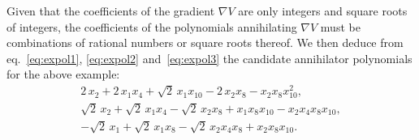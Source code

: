 \documentclass[11pt,a4paper]{article}
\begin{document}
	Given that the coefficients of the gradient $\nabla V$ are only integers and square roots of integers, the coefficients of the polynomials annihilating $\nabla V$ must be combinations of rational numbers or square roots thereof. We then deduce from eq.~\eqref{eq:expol1}, \eqref{eq:expol2} and~\eqref{eq:expol3} the candidate annihilator polynomials for the above example:
	\begin{equation}
		\begin{gathered}
			2\,x_{2} + 2\,x_{1}x_{4} + \sqrt{2}\,x_{1}x_{10} - 2\,x_{2}x_{8} - x_{2}x_{8}x_{10}^{2},\\
	      \sqrt{2}\,x_{2} + \sqrt{2}\,x_{1}x_{4} - \sqrt{2}\,x_{2}x_{8} + x_{1}x_{8}x_{10} - x_{2}x_{4}x_{8}x_{10}, \\
	      -\sqrt{2}\,x_{1} + \sqrt{2}\,x_{1}x_{8} - \sqrt{2}\,x_{2}x_{4}x_{8} + x_{2}x_{8}x_{10}.
		\end{gathered}
	\end{equation}
\end{document}
